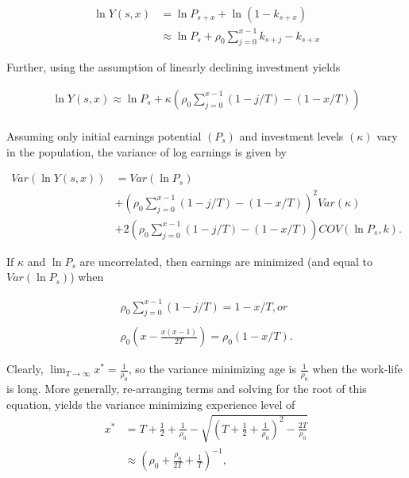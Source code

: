 \begin{frame}
	\begin{align*}
	\ln{Y(s,x)} & = \ln{P_{s+x}} + \ln{(1 - k_{s+x})} \\
	& \approx \ln{P_s} + \rho_0 \sum^{x - 1}_{j=0} k_{s+j} - k_{s+x}
	\end{align*}
	
	Further, using the assumption of linearly declining investment yields
	
	\begin{align*}
	\ln{Y(s,x)} \approx \ln{P_s} + \kappa \left(\rho_0 \sum^{x - 1}_{j=0} (1 - j/T) - (1 - x/T)\right) \\
	\end{align*}
\end{frame}

\begin{frame}
	Assuming only initial earnings potential $(P_s)$ and investment levels $(\kappa)$ vary in the population, the variance of log earnings is given by
	
	\begin{align*}
	Var(\ln{Y(s,x)}) & = Var(\ln{P_s}) \\
	& + \left(\rho_0 \sum^{x - 1}_{j=0} (1 - j/T) - (1 - x/T)\right)^2 Var(\kappa) \\
	& + 2\left(\rho_0 \sum^{x - 1}_{j=0} (1 - j/T) - (1 - x/T)\right) COV(\ln{P_s},k).
	\end{align*}
\end{frame}

\begin{frame}
	If $\kappa$ and $\ln{P_s}$ are uncorrelated, then earnings are minimized (and equal to $Var(\ln{P_s})$)
	when
	
	\begin{align*}
	\rho_0 \sum^{x - 1}_{j=0} (1 - j/T) = 1 - x/T, or \\
	\\
	\rho_0\left(x - \frac{x(x - 1)}{2T}\right) = \rho_0(1 - x/T).
	\end{align*}
\end{frame}

\begin{frame}
	Clearly, $\lim_{T\to\infty} x^* = \frac{1}{\rho_0}$, so the variance minimizing age is $\frac{1}{\rho_0}$ when the work-life is long. More generally, re-arranging terms and solving for the root of this equation, yields the variance minimizing experience level of \\
	
	\begin{align*}
	x^* & = T + \frac{1}{2} + \frac{1}{\rho_0} - \sqrt{\left(T + \frac{1}{2} + \frac{1}{\rho_0}\right)^2 - \frac{2T}{\rho_0}} \\
	& \approx \left(\rho_0 + \frac{\rho_0}{2T} + \frac{1}{T}\right)^{-1},
	\end{align*}
\end{frame}

